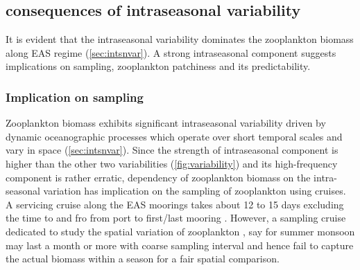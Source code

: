 \documentclass{article}
\begin{document}
 	\subsection{consequences of intraseasonal variability}
	It is evident that the intraseasonal variability dominates the zooplankton biomass along EAS regime (\autoref{sec:intsnvar}). A strong intraseasonal component suggests implications on sampling, zooplankton patchiness and its predictability.
 
    \subsubsection{Implication on sampling}  
    \label{sec:samplingimplication}
    Zooplankton biomass exhibits significant intraseasonal variability driven by dynamic oceanographic processes which operate over short temporal scales and vary in space (\autoref{sec:intsnvar}). Since the strength of intraseasonal component is higher than the other two variabilities (\cref{fig:variability}) and its high-frequency component is rather erratic, dependency of zooplankton biomass on the intra-seasonal variation has implication on the sampling of zooplankton using cruises. A servicing cruise along the EAS moorings takes about 12 to 15 days excluding the time to and fro from port to first/last mooring \citep{ chaudhuri2020observed, aparna2022seasonal}. However, a sampling cruise dedicated to study the spatial variation of zooplankton \citep{madhupratap1992zooplankton,smith1998seasonal,wishner1998mesozooplankton, kidwai2000dd}, say for summer monsoon may last a month or more with coarse sampling interval and hence fail to capture the actual biomass within a season for a fair spatial comparison. 
    
\end{document}
